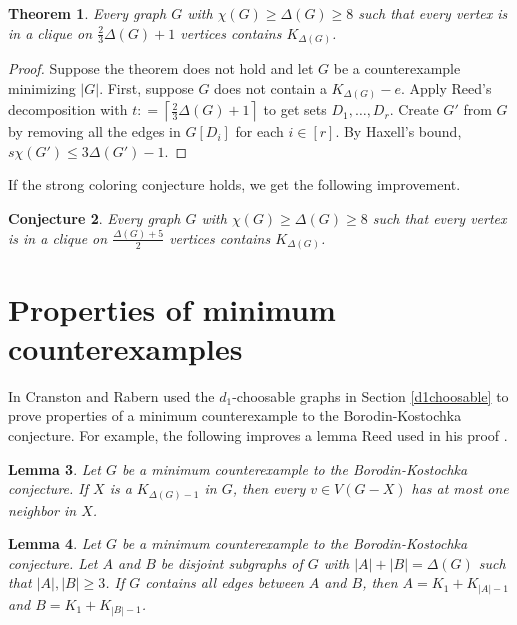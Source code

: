 \documentclass[12pt]{article}
\theoremstyle{plain}
\newtheorem{thm}{Theorem}
\newtheorem{lem}[thm]{Lemma}
\newtheorem{conjecture}[thm]{Conjecture}
\theoremstyle{definition}
\theoremstyle{remark}
\newcommand{\card}[1]{\left|#1\right|}
\newcommand{\ceil}[1]{\left\lceil#1\right\rceil}
\newcommand{\irange}[1]{\left[#1\right]}
\newcommand{\DefinedAs}{\mathrel{\mathop:}=}
\begin{document}
\begin{thm}\label{TwoThirdsCliqueCorImproved}
Every graph $G$ with $\chi(G) \ge \Delta(G) \ge 8$ such that every
vertex is in a clique on $\frac23\Delta(G) + 1$ vertices contains $K_{\Delta(G)}$.
\end{thm}
\begin{proof}
Suppose the theorem does not hold and let $G$ be a counterexample minimizing $\card{G}$.  First, suppose $G$ does not contain a $K_{\Delta(G)} - e$.
Apply Reed's decomposition with $t \DefinedAs \ceil{\frac23\Delta(G) + 1}$ to get sets $D_1, \ldots, D_r$.  Create $G'$ from $G$ by removing all the edges in $G[D_i]$ for
each $i \in \irange{r}$.  By Haxell's bound, $s\chi(G') \le 3\Delta(G') - 1$.
\end{proof}

If the strong coloring conjecture holds, we get the following improvement.

\begin{conjecture}\label{TwoThirdsCliqueCorImprovedMore}
Every graph $G$ with $\chi(G) \ge \Delta(G) \ge 8$ such that every
vertex is in a clique on $\frac{\Delta(G) + 5}{2}$ vertices contains $K_{\Delta(G)}$.
\end{conjecture}

\section{Properties of minimum counterexamples}\label{mules}
In \cite{cranstonrabernapriori} Cranston and Rabern used the $d_1$-choosable graphs in Section \ref{d1choosable} to prove properties 
of a minimum counterexample to the Borodin-Kostochka conjecture.  For example, the following improves a lemma Reed used in his proof \cite{reed1999strengthening}.

\begin{lem}
Let $G$ be a minimum counterexample to the Borodin-Kostochka conjecture.  If $X$ is a $K_{\Delta(G) - 1}$ in $G$, then every $v \in V(G-X)$ has at most one neighbor in $X$.
\end{lem}

\begin{lem}
Let $G$ be a minimum counterexample to the Borodin-Kostochka conjecture. Let $A$ and $B$ be disjoint subgraphs of $G$ with $\card{A} + \card{B} = \Delta(G)$ 
such that $\card{A},\card{B} \ge 3$.  If $G$ contains all edges between $A$ and $B$,
then $A = K_1 + K_{\card{A} - 1}$ and $B = K_1 + K_{\card{B} - 1}$.
\end{lem}
\end{document}

